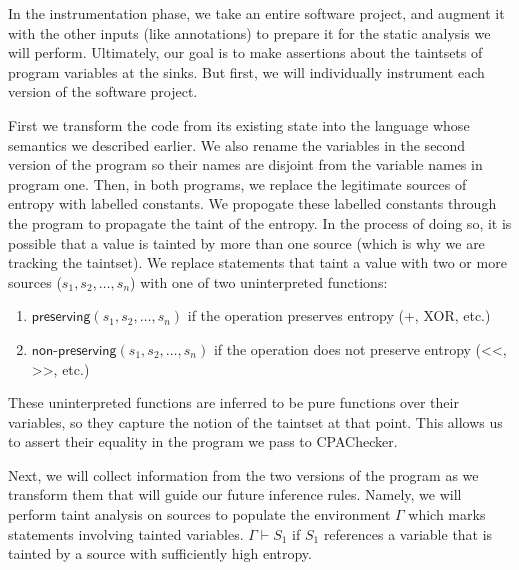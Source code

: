\documentclass[letterpaper,twocolumn,10pt]{article}
\begin{document}

	In the instrumentation phase, we take an entire software project, and augment it with the other inputs (like annotations) to prepare it for the static analysis we will perform. Ultimately, our goal is to make assertions about the taintsets of program variables at the sinks. But first, we will individually instrument each version of the software project.

	First we transform the code from its existing state into the language whose semantics we described earlier. We also rename the variables in the second version of the program so their names are disjoint from the variable names in program one. Then, in both programs, we replace the legitimate sources of entropy with labelled constants. We propogate these labelled constants through the program to propagate the taint of the entropy. In the process of doing so, it is possible that a value is tainted by more than one source (which is why we are tracking the taintset). We replace statements that taint a value with two or more sources ($s_1, s_2, \ldots, s_n$) with one of two uninterpreted functions: 

	\begin{enumerate}
		\item $\textsf{preserving}(s_1, s_2, \ldots, s_n)$ if the operation preserves entropy (+, XOR, etc.)
		\item $\textsf{non-preserving}(s_1, s_2, \ldots, s_n)$ if the operation does not preserve entropy (<<, >>, etc.)
	\end{enumerate}

	These uninterpreted functions are inferred to be pure functions over their variables, so they capture the notion of the taintset at that point. This allows us to assert their equality in the program we pass to CPAChecker. 

	Next, we will collect information from the two versions of the program as we transform them that will guide our future inference rules. Namely, we will perform taint analysis on sources to populate the environment $\Gamma$ which marks statements involving tainted variables. $\Gamma \vdash S_1$ if $S_1$ references a variable that is tainted by a source with sufficiently high entropy.  

\end{document}
